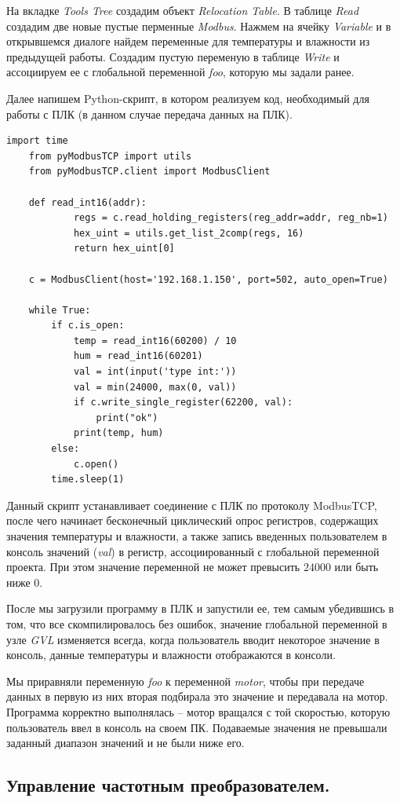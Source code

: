 \documentclass[a4paper, 12pt]{article}
\begin{document}
    На вкладке \textit{Tools Tree} создадим объект \textit{Relocation Table}. В таблице \textit{Read} создадим две
    новые пустые перменные \textit{Modbus}. Нажмем на ячейку \textit{Variable} и в открывшемся диалоге найдем переменные для
    температуры и влажности из предыдущей работы. Создадим пустую переменую в таблице \textit{Write} и ассоциируем ее с
    глобальной переменной \textit{foo}, которую мы задали ранее.


    Далее напишем Python-скрипт, в котором реализуем код, необходимый для работы с ПЛК (в данном случае передача данных на ПЛК).
    \begin{lstlisting}[label=code, caption={Python-скрипт для взаимодействия с ПЛК.}]
    import time
    from pyModbusTCP import utils
    from pyModbusTCP.client import ModbusClient
        
    def read_int16(addr):
            regs = c.read_holding_registers(reg_addr=addr, reg_nb=1)
            hex_uint = utils.get_list_2comp(regs, 16)
            return hex_uint[0]
        
    c = ModbusClient(host='192.168.1.150', port=502, auto_open=True)
        
    while True:
        if c.is_open:
            temp = read_int16(60200) / 10
            hum = read_int16(60201)
            val = int(input('type int:'))
            val = min(24000, max(0, val))
            if c.write_single_register(62200, val):
                print("ok")
            print(temp, hum)
        else:
            c.open()
        time.sleep(1)
    \end{lstlisting}

    
    Данный скрипт устанавливает соединение с ПЛК по протоколу
    ModbusTCP, после чего начинает бесконечный циклический опрос
    регистров, содержащих значения температуры и влажности, а также
    запись введенных пользователем в консоль значений (\textit{val}) в регистр,
    ассоциированный с глобальной переменной проекта. При этом значение переменной
    не может превысить $24000$ или быть ниже $0$.


    После мы загрузили программу в ПЛК и запустили ее, тем самым убедившись
    в том, что все скомпилировалось без ошибок, значение глобальной переменной в узле \textit{GVL} изменяется всегда, когда пользователь
    вводит некоторое значение в консоль, данные температуры и влажности отображаются в консоли.


    Мы приравняли переменную \textit{foo} к переменной \textit{motor}, чтобы при передаче данных в первую из них вторая подбирала это значение и передавала на мотор.
    Программа корректно выполнялась -- мотор вращался с той скоростью, которую пользователь ввел в консоль на своем ПК. Подаваемые значения не превышали заданный диапазон значений и не были
    ниже его.

    
    \subsection{Управление частотным преобразователем.}
    
\end{document}
